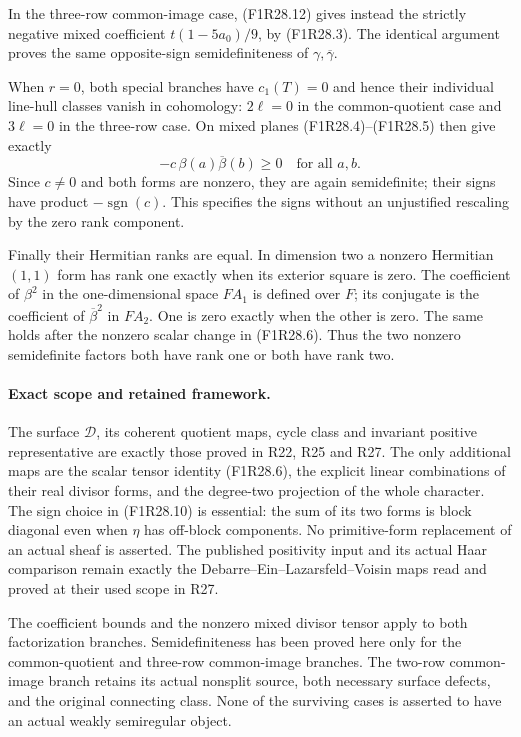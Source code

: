 In the three-row common-image case,
(F1R28.12) gives instead the strictly
negative mixed coefficient
$t(1-5a_0)/9$, by (F1R28.3).
The identical argument proves the same
opposite-sign semidefiniteness of
$\gamma,\overline\gamma$.

When $r=0$, both special branches have
$c_1(T)=0$ and hence their individual
line-hull classes vanish in cohomology:
$2\ell=0$ in the common-quotient case
and $3\ell=0$ in the three-row case.
On mixed planes (F1R28.4)--(F1R28.5)
then give exactly
\[
                    -c\,\beta(a)\overline\beta(b)\ge0
                         \quad\text{for all }a,b.
 \tag{F1R28.14}
\]
Since $c\ne0$ and both forms are nonzero,
they are again semidefinite; their signs
have product $-\operatorname{sgn}(c)$.
This specifies the signs without an
unjustified rescaling by the zero
rank component.

Finally their Hermitian ranks are equal.
In dimension two a nonzero Hermitian
$(1,1)$ form has rank one exactly when
its exterior square is zero.
The coefficient of $\beta^2$ in
the one-dimensional space $F A_1$
is defined over $F$; its conjugate is
the coefficient of $\overline\beta^2$
in $F A_2$. One is zero exactly when
the other is zero. The same holds
after the nonzero scalar change in
(F1R28.6).
Thus the two nonzero semidefinite
factors both have rank one or both
have rank two.

\paragraph{Exact scope and retained framework.}
The surface $\mathcal D$, its coherent
quotient maps, cycle class and invariant
positive representative are exactly
those proved in R22, R25 and R27.
The only additional maps are the scalar
tensor identity (F1R28.6), the explicit
linear combinations of their real
divisor forms, and the degree-two
projection of the whole character.
The sign choice in (F1R28.10) is
essential: the sum of its two forms
is block diagonal even when $\eta$
has off-block components.
No primitive-form replacement of an
actual sheaf is asserted.
The published positivity input and its
actual Haar comparison remain exactly
the Debarre--Ein--Lazarsfeld--Voisin
maps read and proved at their used
scope in R27.

The coefficient bounds and the
nonzero mixed divisor tensor apply
to both factorization branches.
Semidefiniteness has been proved
here only for the common-quotient
and three-row common-image branches.
The two-row common-image branch
retains its actual nonsplit source,
both necessary surface defects,
and the original connecting class.
None of the surviving cases is
asserted to have an actual weakly
semiregular object.
